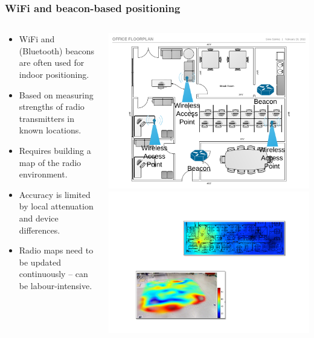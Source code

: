 \documentclass[xcolor=svgnames,english,handout]{beamer}
\begin{document}
\begin{frame}
  \frametitle{WiFi and beacon-based positioning}

  \begin{columns}
  \begin{column}{0.6\textwidth}
  \begin{itemize}[<+->]       
  \item \alert{WiFi and (Bluetooth) beacons} are often used for indoor positioning.
  \item Based on measuring strengths of \alert{radio transmitters in known locations}.
  \item Requires building a \alert{map of the radio environment}.
  \item \alert{Accuracy} is limited by \alert{local attenuation and device differences}.
  \item \alert{Radio maps} need to be \alert{updated} continuously -- can be labour-intensive.
  \end{itemize}
  \end{column}
  \begin{column}{0.4\textwidth}
  \includegraphics[width=\columnwidth]{floorplan} \\
  \vspace{2em}
  \includegraphics[width=\columnwidth]{wifimap}
  \end{column}
  \end{columns}
\end{frame}
\end{document}
